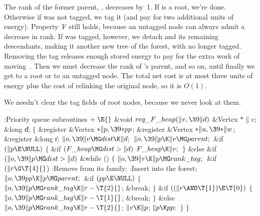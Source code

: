The rank of the former parent, , decreases by~1. If  is a root,
we're done. Otherwise if  was not tagged, we tag it (and pay for
two additional units of energy). Property~F still holds, because an
untagged node can always admit a decrease in rank. If  was tagged,
however, we detach  and its remaining descendants, making it another
new tree of the forest, with  no longer tagged. Removing the tag
releases enough stored energy to pay for the extra work of moving~.
Then we must decrease the rank of 's parent, and so on, until finally
we get to a root or to an untagged node. The total net cost is at most
three units of energy plus the cost of relinking the original node,
so it is $O(1)$.

We needn't clear the tag fields of root nodes, because we never
look at them.

\Y\B\4:Priority queue subroutines\X${}\mathrel+\E{}$\6
\1\1\&{void} ${}\\{req\_F\_heap}(\|v,\39\|d){}$\6
\&{Vertex} ${}{*}\|v{}$;\6
\&{long} \|d;\2\2\6
${}\{{}$\5
\1\&{register} \&{Vertex} ${}{*}\|p,\39{*}\\{pp}{}$;\6
\&{register} \&{Vertex} ${}{*}\|u,\39{*}\|w{}$;\6
\&{register} \&{long} \|r;\7
${}\|o,\39\|v\MG\\{dist}\K\|d;{}$\6
${}\|o,\39\|p\K\|v\MG\\{parent};{}$\6
\&{if} ${}(\|p\E\NULL){}$\5
${}\{{}$\1\6
\&{if} ${}(\\{F\_heap}\MG\\{dist}>\|d){}$\1\5
${}\\{F\_heap}\K\|v;{}$\2\6
\4${}\}{}$\5
\2\&{else} \&{if} ${}(\|o,\39\|p\MG\\{dist}>\|d){}$\1\6
\&{while} ()\5
${}\{{}$\1\6
${}\|o,\39\|r\K\|p\MG\\{rank\_tag};{}$\6
\&{if} ${}(\|r\G\T{4}{}$)\1\6
:Remove  from its family\X;\2\6
:Insert  into the forest\X;\6
${}\|o,\39\\{pp}\K\|p\MG\\{parent};{}$\6
\&{if} ${}(\\{pp}\E\NULL){}$\5
${}\{{}$\1\6
${}\|o,\39\|p\MG\\{rank\_tag}\K\|r-\T{2}{}$;\5
\&{break};\6
\4${}\}{}$\2\6
\&{if} ${}((\|r\AND\T{1})\E\T{0}){}$\5
${}\{{}$\1\6
${}\|o,\39\|p\MG\\{rank\_tag}\K\|r-\T{1}{}$;\5
\&{break};\6
\4${}\}{}$\5
\2\&{else}\1\5
${}\|o,\39\|p\MG\\{rank\_tag}\K\|r-\T{2}{}$;\2\6
${}\|v\K\|p{}$;\5
${}\|p\K\\{pp};{}$\6
\4${}\}{}$\2\2\6
\4${}\}{}$\2\par
\fi

